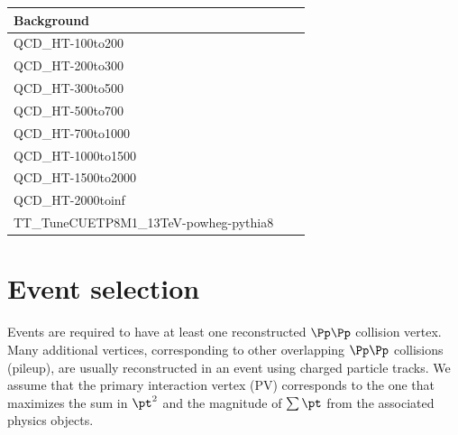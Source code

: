 \begin{table}[htb]\footnotesize
  \begin{center}
    \begin{tabular}{l|c|c}
      \hline
      \hline
      Background \\ 
      \hline
      {QCD\_HT-100to200}   \\
      {QCD\_HT-200to300}  \\
      {QCD\_HT-300to500}\\
      {QCD\_HT-500to700}   \\
      {QCD\_HT-700to1000} \\
      {QCD\_HT-1000to1500}  \\
      {QCD\_HT-1500to2000} \\
      {QCD\_HT-2000toinf}   \\
      \hline
      {TT\_TuneCUETP8M1\_13TeV-powheg-pythia8} \\
      \hline
      \hline
    \end{tabular}
  \end{center}
\end{table}

\section{Event selection}

Events are required to have at least one reconstructed $\Pp\Pp$ collision vertex.
Many additional vertices, corresponding to other overlapping $\Pp\Pp$ collisions (pileup), are usually reconstructed in an event using charged particle tracks. We assume that the primary interaction vertex (PV) corresponds to the one that maximizes the sum in $\pt^2$ and the magnitude of $\sum{\pt}$ from the associated physics objects. 

